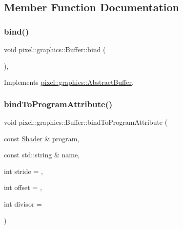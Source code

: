 \subsection{Member Function Documentation}
\mbox{\label{classpixel_1_1graphics_1_1_buffer_ab157f01d131d8416126607f71ab320ce}} 
\subsubsection{\texorpdfstring{bind()}{bind()}}
{\footnotesize\ttfamily void pixel\+::graphics\+::\+Buffer\+::bind (\begin{DoxyParamCaption}{ }\end{DoxyParamCaption})\hspace{0.3cm}{\ttfamily [override]}, {\ttfamily [virtual]}}



Implements \hyperlink{classpixel_1_1graphics_1_1_abstract_buffer_a9d3bb463f35f08f5604012b7d22e113a}{pixel\+::graphics\+::\+Abstract\+Buffer}.

\mbox{\label{classpixel_1_1graphics_1_1_buffer_ae6521f1a22946dc2e23775cef722adca}} 
\subsubsection{\texorpdfstring{bind\+To\+Program\+Attribute()}{bindToProgramAttribute()}}
{\footnotesize\ttfamily void pixel\+::graphics\+::\+Buffer\+::bind\+To\+Program\+Attribute (\begin{DoxyParamCaption}\item[{const \hyperlink{classpixel_1_1graphics_1_1_shader}{Shader} \&}]{program,  }\item[{const std\+::string \&}]{name,  }\item[{int}]{stride = {},  }\item[{int}]{offset = {},  }\item[{int}]{divisor = {} }\end{DoxyParamCaption})}

